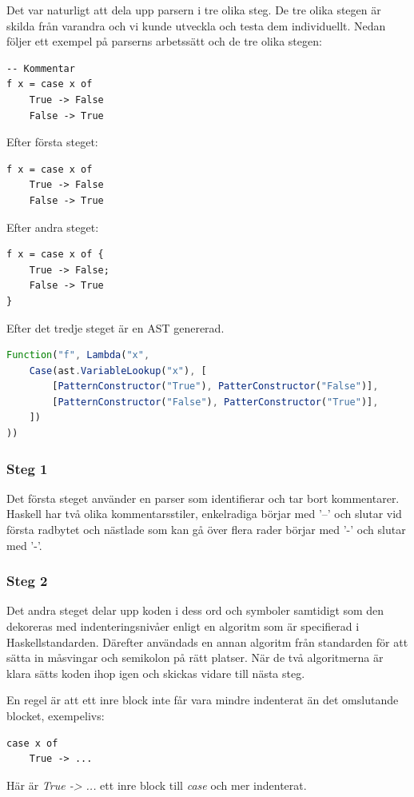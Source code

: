 Det var naturligt att dela upp parsern i tre olika steg. De tre olika stegen är skilda från varandra och vi kunde utveckla och testa dem individuellt.
Nedan följer ett exempel på parserns arbetssätt och de tre olika stegen:
\begin{lstlisting}
-- Kommentar
f x = case x of
    True -> False
    False -> True
\end{lstlisting}

Efter första steget:
\begin{lstlisting}
f x = case x of
    True -> False
    False -> True
\end{lstlisting}

Efter andra steget:
\begin{lstlisting}
f x = case x of {
    True -> False;
    False -> True
}
\end{lstlisting}

Efter det tredje steget är en AST genererad.
\begin{lstlisting}[language=javascript]
Function("f", Lambda("x", 
    Case(ast.VariableLookup("x"), [
        [PatternConstructor("True"), PatterConstructor("False")],
        [PatternConstructor("False"), PatterConstructor("True")],
    ])
))
\end{lstlisting}

\subsubsection{Steg 1}
Det första steget använder en parser som identifierar och tar bort kommentarer. 
Haskell har två olika kommentarsstiler, enkelradiga börjar med '--' och slutar vid första radbytet och 
nästlade som kan gå över flera rader börjar med '{-' och slutar med '-}'.

\subsubsection{Steg 2}
Det andra steget delar upp koden i dess ord och symboler samtidigt som den dekoreras med indenteringsnivåer enligt en algoritm 
som är specifierad i Haskellstandarden. Därefter användads en annan algoritm från standarden för att sätta in måsvingar och semikolon på rätt platser. 
När de två algoritmerna är klara sätts koden ihop igen och skickas vidare till nästa steg.

En regel är att ett inre block inte får vara mindre indenterat än det omslutande blocket, exempelivs:
\begin{lstlisting}
case x of
    True -> ...
\end{lstlisting}
Här är \emph{True -> ...} ett inre block till \emph{case} och mer indenterat.

